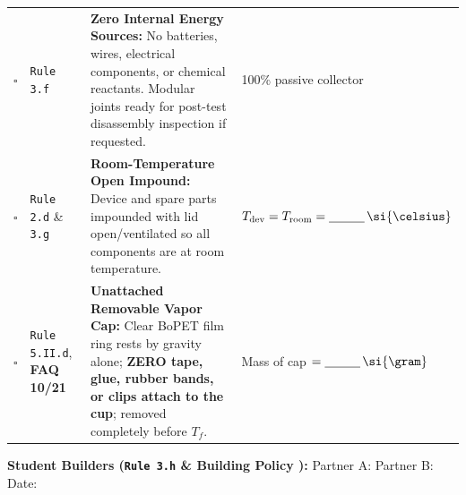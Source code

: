 \begin{rulebox}
{\begin{tabularx}{\linewidth}{@{}c l >{\raggedright\arraybackslash}X l@{}}
\rowcolor{rowalt}$\square$ & \texttt{Rule 3.f} & \textbf{Zero Internal Energy Sources:} No batteries, wires, electrical components, or chemical reactants. Modular joints ready for post-test disassembly inspection if requested. & 100\% passive collector \\
$\square$ & \texttt{Rule 2.d} \& \texttt{3.g} & \textbf{Room-Temperature Open Impound:} Device and spare parts impounded with lid open/ventilated so all components are at room temperature. & $T_{\mathrm{dev}} = T_{\mathrm{room}} = \underline{\hspace{1.0cm}}\,\si{\celsius}$ \\
\rowcolor{rowalt}$\square$ & \texttt{Rule 5.II.d}, \textbf{FAQ 10/21} & \textbf{Unattached Removable Vapor Cap:} Clear BoPET film ring rests by gravity alone; \textbf{ZERO tape, glue, rubber bands, or clips attach to the cup}; removed completely before $T_f$. & Mass of cap $=\underline{\hspace{1.0cm}}\,\si{\gram}$ \\
\bottomrule
\end{tabularx}}
\par\vspace{3pt}\noindent
{\footnotesize\textbf{Student Builders (\texttt{Rule 3.h} \& Building Policy ):} Partner A: \dotfill\quad Partner B: \dotfill\quad Date: \dotfill}
\end{rulebox}
